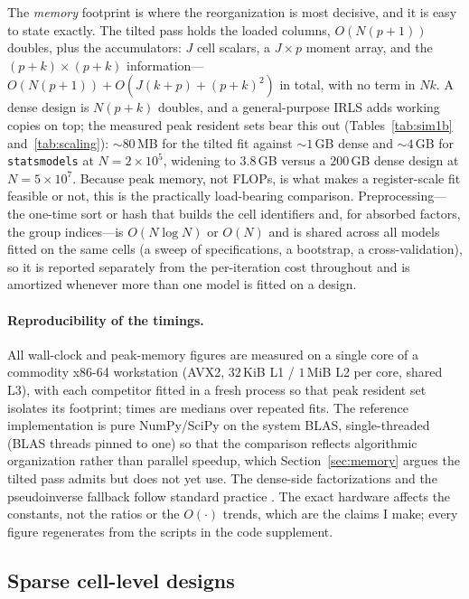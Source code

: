 \documentclass[11pt]{article}
\begin{document}
The \emph{memory} footprint is where the reorganization is most
decisive, and it is easy to state exactly.  The tilted pass holds the
loaded columns, $O(N(p+1))$ doubles, plus the accumulators: $J$ cell
scalars, a $J \times p$ moment array, and the $(p+k) \times (p+k)$
information---$O(N(p+1)) + O(J(k+p) + (p+k)^2)$ in total, with no term in
$Nk$.  A dense design is $N(p+k)$ doubles, and a general-purpose IRLS
adds working copies on top; the measured peak resident sets bear this out
(Tables~\ref{tab:sim1b} and~\ref{tab:scaling}): $\sim\!80$\,MB for the
tilted fit against $\sim\!1$\,GB dense and $\sim\!4$\,GB for
\texttt{statsmodels} at $N = 2\times10^5$, widening to $3.8$\,GB versus a
$200$\,GB dense design at $N = 5\times10^7$.  Because peak memory, not
FLOPs, is what makes a register-scale fit feasible or not, this is the
practically load-bearing comparison.  Preprocessing---the one-time sort
or hash that builds the cell identifiers and, for absorbed factors, the
group indices---is $O(N \log N)$ or $O(N)$ and is shared across all
models fitted on the same cells (a sweep of specifications, a
bootstrap, a cross-validation), so it is reported separately from the
per-iteration cost throughout and is amortized whenever more than one
model is fitted on a design.

\paragraph{Reproducibility of the timings.}  All wall-clock and
peak-memory figures are measured on a single core of a
commodity x86-64 workstation (AVX2, $32$\,KiB L1 / $1$\,MiB L2 per core,
shared L3), with each competitor fitted in a fresh process so that peak
resident set isolates its footprint; times are medians over repeated
fits.  The reference implementation is pure NumPy/SciPy on the system
BLAS, single-threaded (BLAS threads pinned to one) so that the comparison
reflects algorithmic organization rather than parallel speedup, which
Section~\ref{sec:memory} argues the tilted pass admits but does not yet
use.  The dense-side factorizations and the pseudoinverse fallback follow
standard practice \citep{golub2013}.  The exact hardware affects the
constants, not the ratios or the $O(\cdot)$ trends, which are the
claims I make; every figure regenerates from the scripts in the code
supplement.

\subsection{Sparse cell-level designs}\label{sec:sparse-cells}
\end{document}

